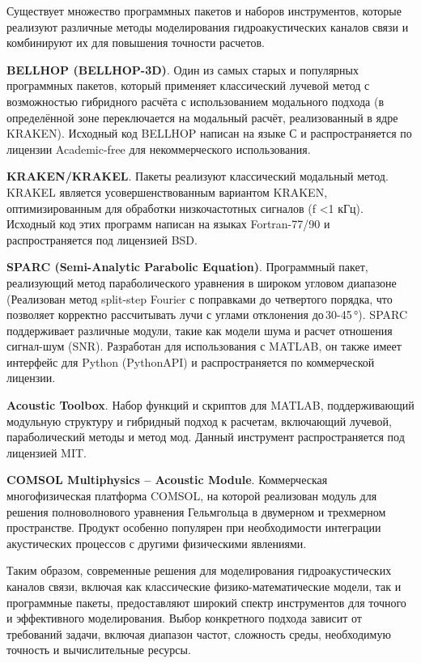 \documentclass[
    numbers=section,
    document-code={ВКРБ--09.03.04--10.19--XX--26--81}
]{../latex/fqw}
\begin{document}
    Существует множество программных пакетов и наборов инструментов, которые
    реализуют различные методы моделирования гидроакустических каналов связи
    и комбинируют их для повышения точности расчетов.

    \textbf{BELLHOP (BELLHOP-3D)\nbspace\cite{porterBELLHOPManualUsers2011}}.
    Один из самых старых и популярных программных пакетов, который применяет классический лучевой метод
    с возможностью гибридного расчёта с использованием модального подхода
    (в определённой зоне переключается на модальный расчёт, реализованный в ядре KRAKEN).
    Исходный код BELLHOP написан на языке С и распространяется по лицензии Academic-free для некоммерческого использования.

    \textbf{KRAKEN/KRAKEL\nbspace\cite{porterKRAKENNormalMode}}.
    Пакеты реализуют классический модальный метод.
    KRAKEL является усовершенствованным вариантом KRAKEN, оптимизированным для обработки низкочастотных сигналов
    (f \textless 1 кГц).
    Исходный код этих программ написан на языках Fortran-77/90 и распространяется под лицензией BSD.

    \textbf{SPARC (Semi-Analytic Parabolic Equation)}.
    Программный пакет, реализующий метод параболического уравнения в широком угловом диапазоне
    (Реализован метод split-step Fourier с поправками до четвертого порядка,
    что позволяет корректно рассчитывать лучи с углами отклонения до\,30-45\,°).
    SPARC поддерживает различные модули, такие как модели шума и расчет отношения сигнал-шум (SNR).
    Разработан для использования с MATLAB, он также имеет интерфейс для Python (PythonAPI) и
    распространяется по коммерческой лицензии.

    \textbf{Acoustic Toolbox\nbspace\cite{porterAcousticsToolbox}}.
    Набор функций и скриптов для MATLAB, поддерживающий модульную структуру и гибридный подход к расчетам,
    включающий лучевой, параболический методы и метод мод.
    Данный инструмент распространяется под лицензией MIT.

    \textbf{COMSOL Multiphysics\nbspace\cite{comsolinc.AcousticsModule} -- Acoustic Module}.
    Коммерческая многофизическая платформа COMSOL, на которой реализован модуль для
    решения полноволнового уравнения Гельмгольца в двумерном и трехмерном пространстве.
    Продукт особенно популярен при необходимости интеграции акустических процессов с другими физическими явлениями.

    Таким образом, современные решения для моделирования гидроакустических каналов связи,
    включая как классические физико-математические модели, так и программные пакеты,
    предоставляют широкий спектр инструментов для точного и эффективного моделирования.
    Выбор конкретного подхода зависит от требований задачи, включая
    диапазон частот,
    сложность среды,
    необходимую точность и
    вычислительные ресурсы.
\end{document}

